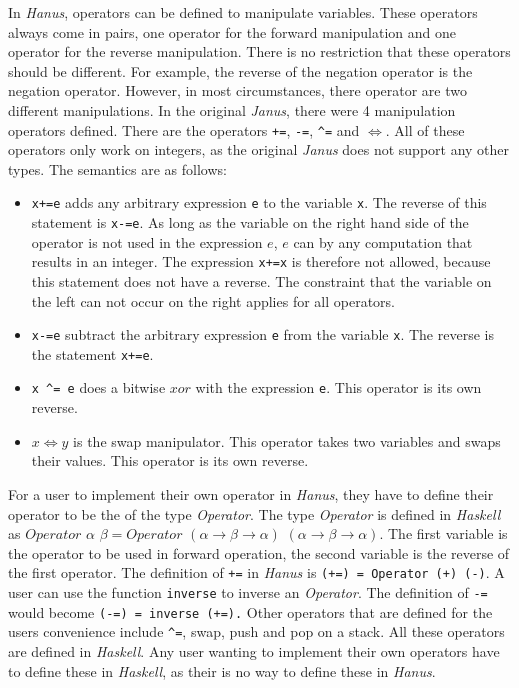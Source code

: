 \documentclass[12pt,a4paper]{article}
\begin{document}
    In \textit{Hanus}, operators can be defined to manipulate variables.  These operators always come in pairs, one operator for the forward manipulation and one operator for the reverse manipulation. There is no restriction that these operators should be different. For example, the reverse of the negation operator is the negation operator. However, in most circumstances, there operator are two different manipulations. In the original \textit{Janus}, there were 4 manipulation operators defined. There are the operators \texttt{+=}, \texttt{-=}, \texttt{\textasciicircum =} and $\Leftrightarrow$. All of these operators only work on integers, as the original \textit{Janus} does not support any other types. The semantics are as follows:
    \begin{itemize}
        \item \texttt{x+=e} adds any arbitrary expression \texttt{e} to the variable \texttt{x}. The reverse of this statement is \texttt{x-=e}. As long as the variable on the right hand side of the operator is not used in the expression $e$, $e$ can by any computation that results in an integer. The expression \texttt{x+=x} is therefore not allowed, because this statement does not have a reverse. The constraint that the variable on the left can not occur on the right applies for all operators.
        \item \texttt{x-=e} subtract the arbitrary expression \texttt{e} from the variable \texttt{x}. The reverse is the statement \texttt{x+=e}.
        \item \texttt{x \textasciicircum = e} does a bitwise $xor$ with the expression \texttt{e}. This operator is its own reverse. 
        \item \texttt{$x\Leftrightarrow y$} is the swap manipulator. This operator takes two variables and swaps their values. This operator is its own reverse. 
    \end{itemize}
    For a user to implement their own operator in \textit{Hanus}, they have to define their operator to be the of the type \textit{Operator}. The type \textit{Operator} is defined in \textit{Haskell} as $Operator$ $\alpha$ $\beta = Operator$ $ (\alpha \rightarrow  \beta \rightarrow  \alpha)$ $(\alpha \rightarrow  \beta \rightarrow \alpha)$. The first variable is the operator to be used in forward operation, the second variable is the reverse of the first operator. The definition of \texttt{+=} in \textit{Hanus} is \texttt{(+=) = Operator  (+) (-)}. A user can use the function \texttt{inverse} to inverse an \textit{Operator}. The definition of \texttt{-=} would become \texttt{(-=) = inverse (+=).} Other operators that are defined for the users convenience include \texttt{\textasciicircum =}, swap, push and pop on a stack. All these operators are defined in \textit{Haskell}. Any user wanting to implement their own operators have to define these in \textit{Haskell}, as their is no way to define these in \textit{Hanus}.
\end{document}
